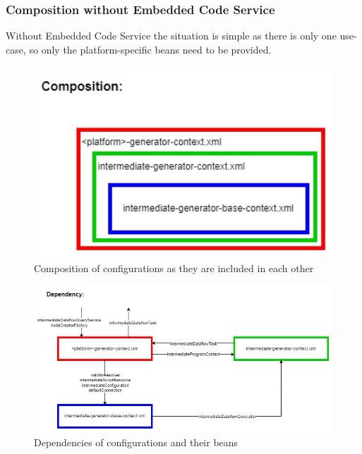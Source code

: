 \subsubsection{Composition without Embedded Code Service}
Without Embedded Code Service the situation is simple as there is only one use-case, so only the platform-specific beans need to be provided.
\begin{figure}[ht]\centering
\includegraphics[width=1.0\textwidth]{img/Intermediate Dataflow Generator Configuration-scanner-only composition.png}
\caption{Composition of configurations as they are included in each other}
\label{fig01:ECSbasedesign02}
\end{figure}   
\begin{figure}[ht]\centering
\includegraphics[width=1.0\textwidth]{img/Intermediate Dataflow Generator Configuration-scanner-only dependency.png}
\caption{Dependencies of configurations and their beans}
\label{fig01:ECSbasedesign02}
\end{figure}   


